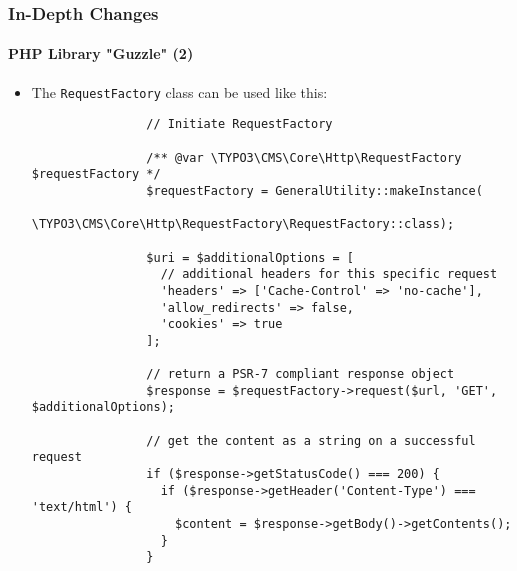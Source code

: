 \begin{frame}[fragile]
	\frametitle{In-Depth Changes}
	\framesubtitle{PHP Library "Guzzle" (2)}

	\lstset{basicstyle=\tiny\ttfamily}

	\begin{itemize}

		\item The \texttt{RequestFactory} class can be used like this:

			\begin{lstlisting}
				// Initiate RequestFactory

				/** @var \TYPO3\CMS\Core\Http\RequestFactory $requestFactory */
				$requestFactory = GeneralUtility::makeInstance(
				  \TYPO3\CMS\Core\Http\RequestFactory\RequestFactory::class);

				$uri = $additionalOptions = [
				  // additional headers for this specific request
				  'headers' => ['Cache-Control' => 'no-cache'],
				  'allow_redirects' => false,
				  'cookies' => true
				];

				// return a PSR-7 compliant response object
				$response = $requestFactory->request($url, 'GET', $additionalOptions);

				// get the content as a string on a successful request
				if ($response->getStatusCode() === 200) {
				  if ($response->getHeader('Content-Type') === 'text/html') {
				    $content = $response->getBody()->getContents();
				  }
				}
			\end{lstlisting}

	\end{itemize}

\end{frame}

